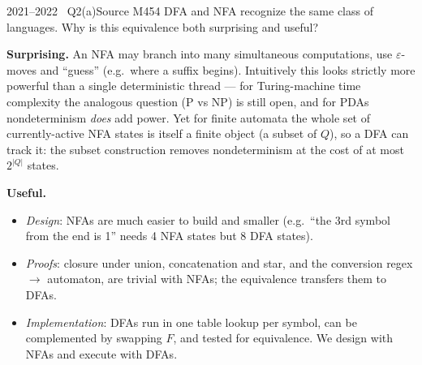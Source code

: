 \documentclass[11pt,a4paper]{article}
\newcommand{\eps}{\varepsilon}
\begin{document}
\begin{question}{2021--2022 \textbullet\ Q2(a)}{Source M45}{4}
DFA and NFA recognize the same class of languages. Why is this equivalence both surprising and useful?
\end{question}
\begin{solution}
\textbf{Surprising.} An NFA may branch into many simultaneous computations, use $\eps$-moves and ``guess'' (e.g.\ where a suffix begins). Intuitively this looks strictly more powerful than a single deterministic thread --- for Turing-machine time complexity the analogous question ($\mathrm P$ vs $\mathrm{NP}$) is still open, and for PDAs nondeterminism \emph{does} add power. Yet for finite automata the whole set of currently-active NFA states is itself a finite object (a subset of $Q$), so a DFA can track it: the subset construction removes nondeterminism at the cost of at most $2^{|Q|}$ states.

\textbf{Useful.}
\begin{itemize}
\item \emph{Design}: NFAs are much easier to build and smaller (e.g.\ ``the 3rd symbol from the end is 1'' needs 4 NFA states but 8 DFA states).
\item \emph{Proofs}: closure under union, concatenation and star, and the conversion regex $\to$ automaton, are trivial with NFAs; the equivalence transfers them to DFAs.
\item \emph{Implementation}: DFAs run in one table lookup per symbol, can be complemented by swapping $F$, and tested for equivalence. We design with NFAs and execute with DFAs.
\end{itemize}
\end{solution}
\end{document}
